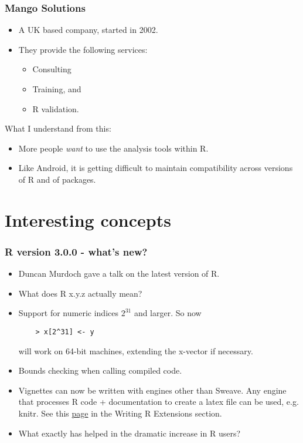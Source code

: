 \documentclass{beamer}
\begin{document}
\begin{frame}
  \frametitle{Mango Solutions}
  \begin{itemize}
   \item A UK based company, started in 2002.
   \item They provide the following services:
    \begin{itemize}
      \item Consulting 
      \item Training, and 
      \item R validation.
    \end{itemize}
  \end{itemize}
  \pause
  \begin{block}{What I understand from this:}
    \begin{itemize}
      \item More people \emph{want} to use the analysis tools within R.
      \item Like Android, it is getting difficult to maintain compatibility
        across versions of R and of packages.
    \end{itemize}
  \end{block}
\end{frame}

\section{Interesting concepts}
\begin{frame}[fragile,label=current]
  \frametitle{R version 3.0.0 - what's new?}
  \begin{itemize}
    \item Duncan Murdoch gave a talk on the latest version of R.
    \item What does R x.y.z actually mean? \pause
    \item Support for numeric indices $2^{31}$ and larger. So now
    \begin{verbatim}
    > x[2^31] <- y
    \end{verbatim}
    will work on 64-bit machines, extending the x-vector if necessary. \pause
    \item Bounds checking when calling compiled code. \pause
    \item Vignettes can now be written with engines other than Sweave. Any
      engine that processes R code + documentation to create a latex file can 
      be used, e.g. knitr. See this
\href{http://cran.r-project.org/doc/manuals/R-exts.html#Non_002dSweave-vignettes}{page} 
      in the Writing R Extensions section. \pause
    \item What exactly has helped in the dramatic increase in R users? \pause
  \end{itemize}
\end{frame}
\end{document}

